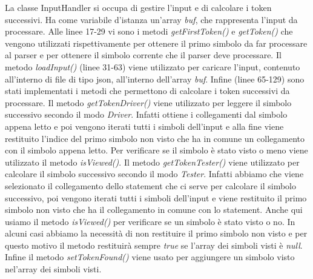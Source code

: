 La classe InputHandler si occupa di gestire l'input e di calcolare i token successivi. Ha come variabile d'istanza un'array \textit{buf}, che rappresenta l'input da processare. Alle linee 17-29 vi sono i metodi \textit{getFirstToken()} e \textit{getToken()} che vengono utilizzati rispettivamente per ottenere il primo simbolo da far processare al parser e per ottenere il simbolo corrente che il parser deve processare. Il metodo \textit{loadInput()} (linee 31-63) viene utilizzato per caricare l'input, contenuto all'interno di file di tipo json, all'interno dell'array \textit{buf}. Infine (linee 65-129) sono stati implementati i metodi che permettono di  calcolare i token successivi da processare. Il metodo \textit{getTokenDriver()} viene utilizzato per leggere il simbolo successivo secondo il modo \textit{Driver}. Infatti ottiene i collegamenti dal simbolo appena letto e poi vengono iterati tutti i simboli dell'input e alla fine viene restituito l'indice del primo simbolo non visto che ha in comune un collegamento con il simbolo appena letto. Per verificare se il simbolo è stato visto o meno viene utilizzato il metodo \textit{isViewed()}. Il metodo \textit{getTokenTester()} viene utilizzato per calcolare il simbolo successivo secondo il modo \textit{Tester}. Infatti abbiamo che viene selezionato il collegamento dello statement che ci serve per calcolare il simbolo successivo, poi vengono iterati tutti i simboli dell'input e viene restituito il primo simbolo non visto che ha il collegamento in comune con lo statement. Anche qui usiamo il metodo \textit{isViewed()} per verificare se un simbolo è stato visto o no. In alcuni casi abbiamo la necessità di non restituire il primo simbolo non visto e per questo motivo il metodo restituirà sempre \textit{true} se l'array dei simboli visti è \textit{null}. Infine il metodo \textit{setTokenFound()} viene usato per aggiungere un simbolo visto nel'array dei simboli visti.
